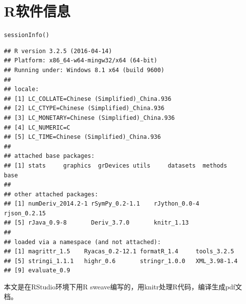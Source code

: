 \documentclass[a4paper]{ctexart}\usepackage[]{graphicx}\usepackage[]{color}
\makeatletter
\newcommand{\hlstd}[1]{\textcolor[rgb]{0.251,0.251,0.251}{#1}}%
\newcommand{\hlkwd}[1]{\textcolor[rgb]{0.69,0.188,0.941}{#1}}%
\newenvironment{kframe}{%
 \def\at@end@of@kframe{}%
 \ifinner\ifhmode%
  \def\at@end@of@kframe{\end{minipage}}%
  \begin{minipage}{\columnwidth}%
 \fi\fi%
 \def\FrameCommand##1{\hskip\@totalleftmargin \hskip-\fboxsep
 \colorbox{shadecolor}{##1}\hskip-\fboxsep
     \hskip-\linewidth \hskip-\@totalleftmargin \hskip\columnwidth}%
 \MakeFramed {\advance\hsize-\width
   \@totalleftmargin\z@ \linewidth\hsize
   \@setminipage}}%
 {\par\unskip\endMakeFramed%
 \at@end@of@kframe}
\newenvironment{knitrout}{}{} %
\makeatother
\begin{document}
\section{R软件信息}
\begin{knitrout}
\color{fgcolor}\begin{kframe}
\begin{alltt}
\hlkwd{sessionInfo}\hlstd{()}
\end{alltt}
\begin{verbatim}
## R version 3.2.5 (2016-04-14)
## Platform: x86_64-w64-mingw32/x64 (64-bit)
## Running under: Windows 8.1 x64 (build 9600)
## 
## locale:
## [1] LC_COLLATE=Chinese (Simplified)_China.936 
## [2] LC_CTYPE=Chinese (Simplified)_China.936   
## [3] LC_MONETARY=Chinese (Simplified)_China.936
## [4] LC_NUMERIC=C                              
## [5] LC_TIME=Chinese (Simplified)_China.936    
## 
## attached base packages:
## [1] stats     graphics  grDevices utils     datasets  methods   base     
## 
## other attached packages:
## [1] numDeriv_2014.2-1 rSymPy_0.2-1.1    rJython_0.0-4     rjson_0.2.15     
## [5] rJava_0.9-8       Deriv_3.7.0       knitr_1.13       
## 
## loaded via a namespace (and not attached):
## [1] magrittr_1.5    Ryacas_0.2-12.1 formatR_1.4     tools_3.2.5    
## [5] stringi_1.1.1   highr_0.6       stringr_1.0.0   XML_3.98-1.4   
## [9] evaluate_0.9
\end{verbatim}
\end{kframe}
\end{knitrout}
本文是在RStudio环境下用R sweave编写的，用knitr\cite{R-knitr}处理R代码，\XeLaTeX{}编译生成pdf文档。

\renewcommand\refname{参考文献} 

 
\end{document}
